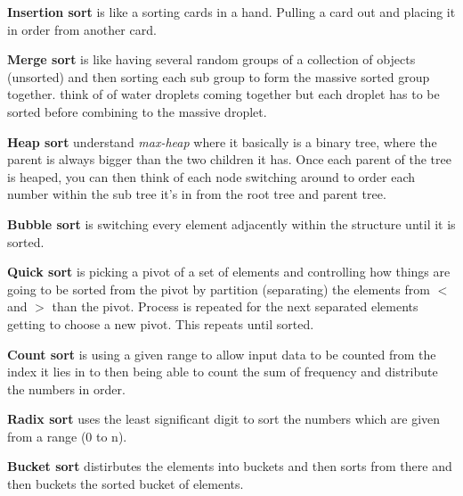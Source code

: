 \documentclass[10pt,letterpaper]{article}
\begin{document}
{\begin{enumerate}
	\textbf{Insertion sort} is like a sorting cards in a hand. Pulling a card out and placing it in order from another card.
	
	\textbf{Merge sort} is like having several random groups of a collection of objects (unsorted) and then sorting each sub group to form the massive sorted group together. think of of water droplets coming together but each droplet has to be sorted before combining to the massive droplet. 
	
	\textbf{Heap sort} understand \textit{max-heap} where it basically is a binary tree, where the parent is always bigger than the two children it has. Once each parent of the tree is heaped, you can then think of each node switching around to order each number within the sub tree it's in from the root tree and parent tree.
	
	\textbf{Bubble sort} is switching every element adjacently within the structure until it is sorted.
	
	\textbf{Quick sort} is picking a pivot of a set of elements and controlling how things are going to be sorted from the pivot by partition (separating) the elements from $<$ and $>$ than the pivot. Process is repeated for the next separated elements getting to choose a new pivot. This repeats until sorted.
	
	\textbf{Count sort} is using a given range to allow input data to be counted from the index it lies in to then being able to count the sum of frequency and distribute the numbers in order.
	
	\textbf{Radix sort}  uses the least significant digit to sort the numbers which are given from a range (0 to n).
	
	\textbf{Bucket sort} distirbutes the elements into buckets and then sorts from there and then buckets the sorted bucket of elements.
	
\end{enumerate}
} %

{

} %

{

} %
\end{document}
